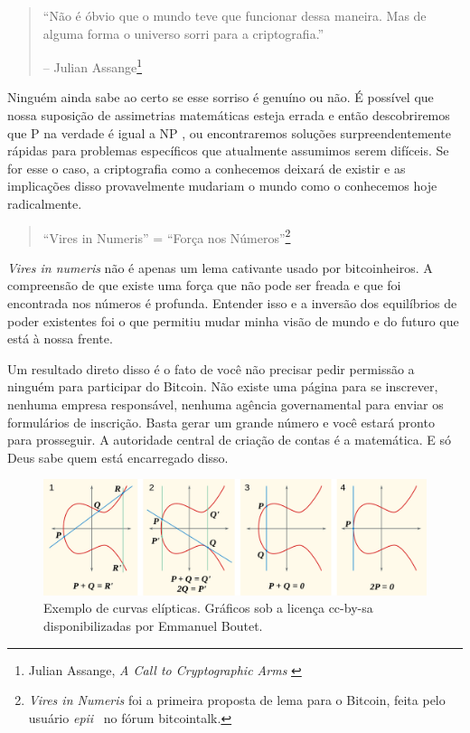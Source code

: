 \begin{quotation}\begin{samepage}
\enquote{Não é óbvio que o mundo teve que funcionar dessa maneira. Mas de alguma forma o universo sorri para a criptografia.}
\begin{flushright} -- Julian Assange\footnote{Julian Assange, \textit{A Call to Cryptographic Arms} \cite{call-to-cryptographic-arms}}
\end{flushright}\end{samepage}\end{quotation}

Ninguém ainda sabe ao certo se esse sorriso é genuíno ou não. É possível que nossa suposição de assimetrias matemáticas esteja errada e então descobriremos que P na verdade é igual a NP \cite{wiki:pnp}, ou encontraremos soluções surpreendentemente rápidas para problemas específicos \cite{wiki:discrete-log} que atualmente assumimos serem difíceis. Se for esse o caso, a criptografia como a conhecemos deixará de existir e as implicações disso provavelmente mudariam o mundo como o conhecemos hoje radicalmente.

\begin{quotation}\begin{samepage}
\enquote{Vires in Numeris} = \enquote{Força nos Números}\footnote{\textit{Vires in Numeris} foi a primeira proposta de lema para o Bitcoin, feita pelo usuário \textit{epii}~\cite{epii} no fórum bitcointalk.}
\end{samepage}\end{quotation}

\textit{Vires in numeris} não é apenas um lema cativante usado por bitcoinheiros. A compreensão de que existe uma força que não pode ser freada e que foi encontrada nos números é profunda. Entender isso e a inversão dos equilíbrios de poder existentes foi o que permitiu mudar minha visão de mundo e do futuro que está à nossa frente.

Um resultado direto disso é o fato de você não precisar pedir permissão a ninguém para participar do Bitcoin. Não existe uma página para se inscrever, nenhuma empresa responsável, nenhuma agência governamental para enviar os formulários de inscrição. Basta gerar um grande número e você estará pronto para prosseguir. A autoridade central de criação de contas é a matemática. E só Deus sabe quem está encarregado disso.

\begin{figure}
  \includegraphics{assets/images/elliptic-curve-examples.png}
  \caption{Exemplo de curvas elípticas. Gráficos sob a licença cc-by-sa disponibilizadas por Emmanuel Boutet.}
  \label{fig:elliptic-curve-examples}
\end{figure}

